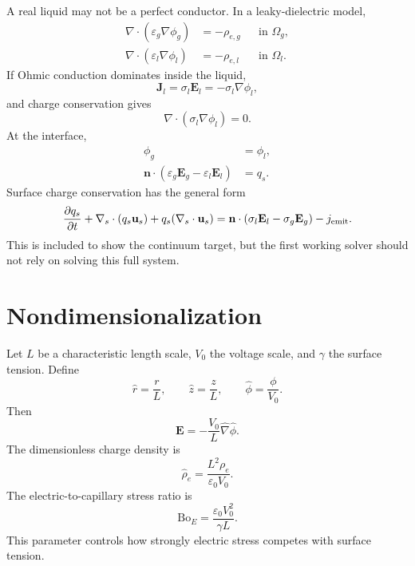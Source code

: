 \documentclass[11pt]{article}
\newcommand{\eps}{\varepsilon}
\newcommand{\vE}{\mathbf{E}}
\newcommand{\vJ}{\mathbf{J}}
\newcommand{\vU}{\mathbf{u}}
\newcommand{\vn}{\mathbf{n}}
\newcommand{\grad}{\nabla}
\newcommand{\divg}{\nabla\!\cdot}
\newcommand{\BoE}{\mathrm{Bo}_E}
\begin{document}
A real liquid may not be a perfect conductor.  In a leaky-dielectric model,
\begin{align}
    \divg(\eps_g\grad\phi_g)&=-\rho_{e,g} &&\text{in }\Omega_g,\\
    \divg(\eps_l\grad\phi_l)&=-\rho_{e,l} &&\text{in }\Omega_l.
\end{align}
If Ohmic conduction dominates inside the liquid,
\begin{equation}
    \vJ_l=\sigma_l\vE_l=-\sigma_l\grad\phi_l,
\end{equation}
and charge conservation gives
\begin{equation}
    \divg(\sigma_l\grad\phi_l)=0.
\end{equation}
At the interface,
\begin{align}
    \phi_g&=\phi_l,\\
    \vn\cdot(\eps_g\vE_g-\eps_l\vE_l)&=q_s.
\end{align}
Surface charge conservation has the general form
\begin{equation}
    \frac{\partial q_s}{\partial t}
    +\nabla_s\cdot(q_s\vU_s)
    +q_s(\nabla_s\cdot\vU_s)
    =
    \vn\cdot(\sigma_l\vE_l-\sigma_g\vE_g)-j_{\rm emit}.
\end{equation}
This is included to show the continuum target, but the first working solver should not rely on solving this full system.

\section{Nondimensionalization}

Let \(L\) be a characteristic length scale, \(V_0\) the voltage scale, and \(\gamma\) the surface tension.  Define
\begin{equation}
    \hat r=\frac{r}{L},\qquad
    \hat z=\frac{z}{L},\qquad
    \hat\phi=\frac{\phi}{V_0}.
\end{equation}
Then
\begin{equation}
    \vE=-\frac{V_0}{L}\hat\grad\hat\phi.
\end{equation}
The dimensionless charge density is
\begin{equation}
    \hat\rho_e=\frac{L^2\rho_e}{\eps_0V_0}.
\end{equation}
The electric-to-capillary stress ratio is
\begin{equation}
    \BoE=\frac{\eps_0V_0^2}{\gamma L}.
\end{equation}
This parameter controls how strongly electric stress competes with surface tension.
\end{document}
